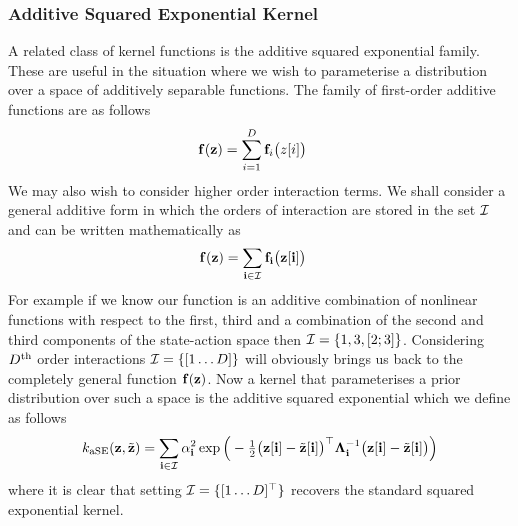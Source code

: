\subsubsection{Additive Squared Exponential Kernel} 
A related class of kernel functions is the additive squared exponential family. These are useful in the situation where we wish to parameterise a distribution over a space of additively separable functions. The family of first-order additive functions are as follows
\begin{align*}
\mathbf{f}(\mathbf{z}) &= \sum_{i=1}^D  \mathbf{f}_i\big(z[i]\big)
\end{align*}
We may also wish to consider higher order interaction terms.
We shall consider a general additive form in which the orders of interaction are stored in the set $\mathcal{I}$ and can be written mathematically as
\begin{align}
\mathbf{f}(\mathbf{z}) &= \sum_{\mathbf{i} \in \mathcal{I}}  \mathbf{f}_{\mathbf{i}}\big(\mathbf{z}[\mathbf{i}]\big)
\end{align}
For example if we know our function is an additive combination of nonlinear functions with respect to the first, third and a combination of the second and third components of the state-action space then $\mathcal{I} = \{1,3,[2;3]\}$. Considering $D^{\text{th}}$ order interactions $\mathcal{I} = \{[1 \dots D]\}$ will obviously brings us back to the completely general function $\mathbf{f}(\mathbf{z})$. 
%
Now a kernel that parameterises a prior distribution over such a space is the additive squared exponential which we define as follows
\begin{equation}
k_{\text{aSE}}(\mathbf{z},\tilde{\mathbf{z}}) = \sum_{\mathbf{i} \in \mathcal{I}} \alpha_{\mathbf{i}}^2 \exp\Big(-\tfrac{1}{2}\big(\mathbf{z}[\mathbf{i}] - \tilde{\mathbf{z}}[\mathbf{i}]\big)^\top\boldsymbol{\Lambda}_{\mathbf{i}}^{-1}\big(\mathbf{z}[\mathbf{i}] - \tilde{\mathbf{z}}[\mathbf{i}]\big) \Big)
\label{eqn:aSEkernel}
\end{equation}
where it is clear that setting $\mathcal{I} = \{[1 \dots D]^\top\}$ recovers the standard squared exponential kernel.

